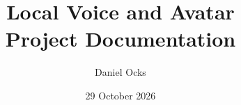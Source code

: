 \documentclass{ol-softwaremanual}
\title{Local Voice and Avatar\\Project Documentation}
\author{Daniel Ocks}
\date{29 October 2026}
\begin{document}
\maketitle
\tableofcontents
\lstlistoflistings
\clearpage


\clearpage

\clearpage

\clearpage
\appendix

\clearpage

\end{document}
